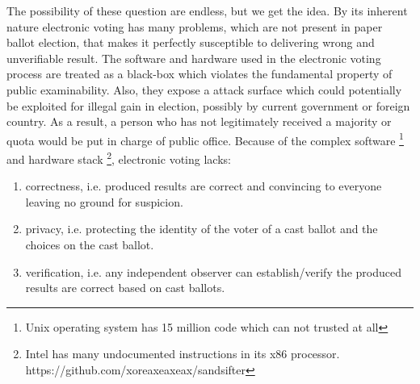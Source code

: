    \noindent
   The possibility of these question are endless, but we get the idea.  
   By its inherent nature electronic voting has many 
   problems, which are not present in paper ballot election, that makes it perfectly susceptible 
   to delivering wrong and unverifiable result.
   The software and hardware used in the electronic voting process  
	are treated as a black-box which  violates the 
	fundamental property of  public examinability. Also, they 
	expose a attack surface
	which  could potentially be exploited for illegal gain in election, possibly by 
	current government or foreign country. As a result, a person who has 
	not legitimately received a majority or quota would be  put in charge of public office. 
    Because of the complex software
    \footnote{Unix operating system has 15 million code which can not trusted at all}
    and hardware stack
 \footnote{Intel has many undocumented instructions in its x86 
 processor. https://github.com/xoreaxeaxeax/sandsifter}, 
   electronic voting lacks:  
   \begin{enumerate}
   \item correctness, i.e. produced results are correct and convincing to everyone leaving 
   no ground for suspicion.
   \item privacy,  i.e.  protecting the identity of the voter of a cast ballot
   and the choices on the cast ballot.
   \item verification, i.e. any independent observer  can establish/verify
    the produced results are correct based on cast ballots.
   \end{enumerate}
  
   
   
   
%   
%      
%   
%   
   
